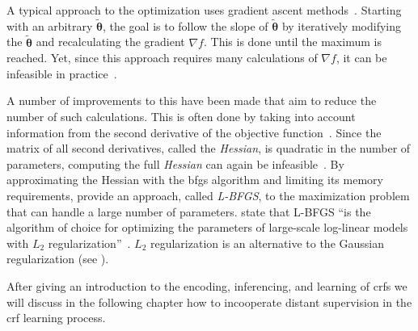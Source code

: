 \bigskip

A typical approach to the optimization uses gradient ascent methods~\citep{koller2009probabilistic}.
Starting with an arbitrary $\bm{\tilde{\theta}}$, the goal is to follow the slope of $\bm{\tilde{\theta}}$ by iteratively modifying the $\bm{\tilde{\theta}}$ and recalculating the gradient $\nabla f$.
This is done until the maximum is reached.
Yet, since this approach requires many calculations of $\nabla f$, it can be infeasible in practice~\citep{sutton2010introduction}.

A number of improvements to this have been made that aim to reduce the number of such calculations.
This is often done by taking into account information from the second derivative of the objective function~\citep{sutton2010introduction}.
Since the matrix of all second derivatives, called the \textit{Hessian}, is quadratic in the number of parameters, computing the full \textit{Hessian} can again be infeasible~\citep{sutton2010introduction}.
By approximating the Hessian with the \gls{bfgs} algorithm and limiting its memory requirements, \citet{byrd1994representations} provide an approach, called \textit{L-BFGS}, to the maximization problem that can handle a large number of parameters.
\citet{andrew2007scalable} state that L-BFGS ``is the algorithm of choice for optimizing the parameters of large-scale log-linear models with $L_2$ regularization''~\citep{andrew2007scalable}.
$L_2$ regularization is an alternative to the Gaussian regularization (see ).

\bigskip

After giving an introduction to the encoding, inferencing, and learning of \glspl{crf} we will discuss in the following chapter how to incooperate \gls{distant supervision} in the \gls{crf} learning process.
